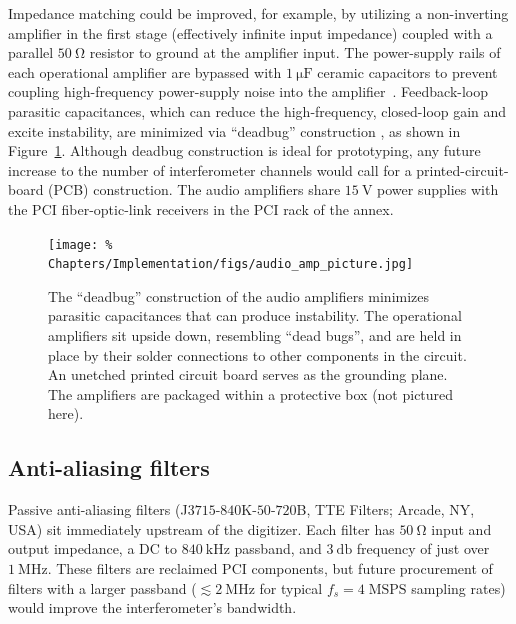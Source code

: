 Impedance matching could be improved, for example,
by utilizing a non-inverting amplifier in the first stage
(effectively infinite input impedance) coupled with
a parallel $\SI{50}{\ohm}$ resistor to ground at the amplifier input.
The power-supply rails of each operational amplifier
are bypassed with $\SI{1}{\micro\farad}$ ceramic capacitors
to prevent coupling high-frequency power-supply noise
into the amplifier~\cite[Sec.~4.2.7]{horowitz_and_hill}.
Feedback-loop parasitic capacitances,
which can reduce the high-frequency, closed-loop gain and excite instability,
are minimized via ``deadbug'' construction
\cite{linear_technology_high_speed_amplifier_tech},
as shown in Figure~\ref{fig:Implementation:audio_amplifier_picture}.
Although deadbug construction is ideal for prototyping,
any future increase to the number of interferometer channels
would call for a printed-circuit-board (PCB) construction.
The audio amplifiers share $\SI{15}{\volt}$ power supplies
with the PCI fiber-optic-link receivers
in the PCI rack of the \diiid\space annex.

\begin{figure}
  \centering
  \texttt{[image: \%
    Chapters/Implementation/figs/audio\_amp\_picture.jpg]}
  \caption[``Deadbug'' construction of audio amplifiers]{%
    The ``deadbug'' construction of the audio amplifiers
    minimizes parasitic capacitances that can produce instability.
    The operational amplifiers sit upside down,
    resembling ``dead bugs'', and
    are held in place by their solder connections
    to other components in the circuit.
    An unetched printed circuit board
    serves as the grounding plane.
    The amplifiers are packaged within a protective box
    (not pictured here).
  }
\label{fig:Implementation:audio_amplifier_picture}
\end{figure}


\subsection{Anti-aliasing filters}
\label{sec:Implementation:Hardware:anti_aliasing_filters}
Passive anti-aliasing filters
({J$3715$-$840$K-$50$-$720$B}, TTE Filters; Arcade, NY, USA)
sit immediately upstream of the digitizer.
Each filter has $\SI{50}{\ohm}$ input and output impedance,
a DC to $\SI{840}{\kilo\hertz}$ passband, and
$\SI{3}{\decibel}$ frequency of just over $\SI{1}{\mega\hertz}$.
These filters are reclaimed PCI components, but
future procurement of filters with a larger passband
($\lesssim \SI{2}{\mega\hertz}$ for
typical $f_s = 4 \; \text{MSPS}$ sampling rates)
would improve the interferometer's bandwidth.


